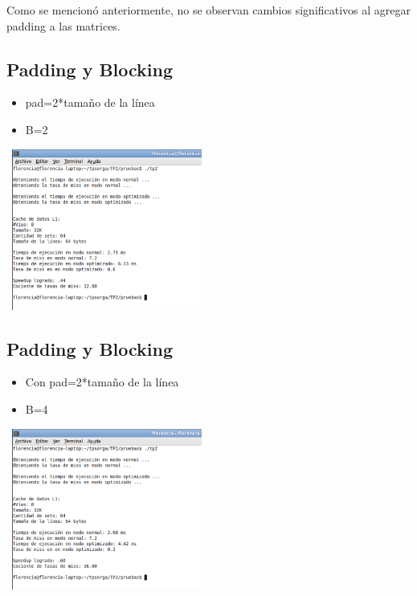 \documentclass[a4paper,10pt]{article}
\begin{document}
Como se mencion\'o anteriormente, no se observan cambios significativos al agregar padding a las matrices.\\


\subsection*{Padding y Blocking}
\begin{itemize}
 \item pad=2*tama\~no de la l\'inea
 \item B=2
\end{itemize}

\begin{center}
 \includegraphics[width=250px,height=200px,bb=0 0 328 277,scale=1]{./ssh4.png}
\end{center}

\subsection*{Padding y Blocking}
\begin{itemize}
\item Con pad=2*tama\~no de la l\'inea
\item B=4
\end{itemize}
\begin{center}
 \includegraphics[width=250px,height=200px,bb=0 0 328 277,scale=1]{./ssh5.png}
\end{center}
\end{document}
